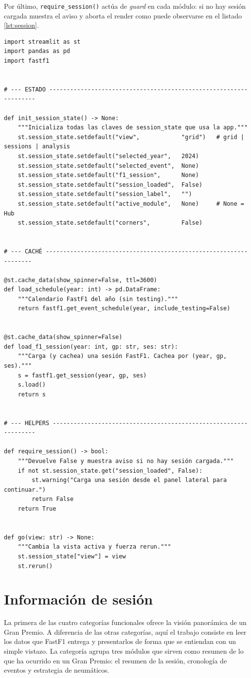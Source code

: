 \documentclass[12pt,a4paper,twoside,openright]{book}
\begin{document}
\noindent Por último, \texttt{require\_session()} actúa de \textit{guard} en cada módulo: si no hay sesión cargada muestra el aviso y aborta el render
como puede observarse en el listado \ref{lst:session}.
\begin{lstlisting}[style=python,caption={Gestión de estado y caché en \texttt{session\_loader.py}.},label=lst:session]
import streamlit as st
import pandas as pd
import fastf1


# --- ESTADO ------------------------------------------------------------------

def init_session_state() -> None:
    """Inicializa todas las claves de session_state que usa la app."""
    st.session_state.setdefault("view",            "grid")   # grid | sessions | analysis
    st.session_state.setdefault("selected_year",   2024)
    st.session_state.setdefault("selected_event",  None)
    st.session_state.setdefault("f1_session",      None)
    st.session_state.setdefault("session_loaded",  False)
    st.session_state.setdefault("session_label",   "")
    st.session_state.setdefault("active_module",   None)     # None = Hub
    st.session_state.setdefault("corners",         False)


# --- CACHÉ ------------------------------------------------------------------

@st.cache_data(show_spinner=False, ttl=3600)
def load_schedule(year: int) -> pd.DataFrame:
    """Calendario FastF1 del año (sin testing)."""
    return fastf1.get_event_schedule(year, include_testing=False)


@st.cache_data(show_spinner=False)
def load_f1_session(year: int, gp: str, ses: str):
    """Carga (y cachea) una sesión FastF1. Cachea por (year, gp, ses)."""
    s = fastf1.get_session(year, gp, ses)
    s.load()
    return s


# --- HELPERS -----------------------------------------------------------------

def require_session() -> bool:
    """Devuelve False y muestra aviso si no hay sesión cargada."""
    if not st.session_state.get("session_loaded", False):
        st.warning("Carga una sesión desde el panel lateral para continuar.")
        return False
    return True


def go(view: str) -> None:
    """Cambia la vista activa y fuerza rerun."""
    st.session_state["view"] = view
    st.rerun()
\end{lstlisting}

\section{Información de sesión}
La primera de las cuatro categorías funcionales ofrece la visión panorámica de un Gran Premio. A diferencia de las otras categorías, aquí el trabajo consiste en leer los datos
que FastF1 entrega y presentarlos de forma que se entiendan con un simple vistazo. La categoría agrupa tres módulos que sirven como resumen de lo que ha ocurrido en un Gran Premio:
el resumen de la sesión, cronología de eventos y estrategia de neumáticos.
\end{document}
